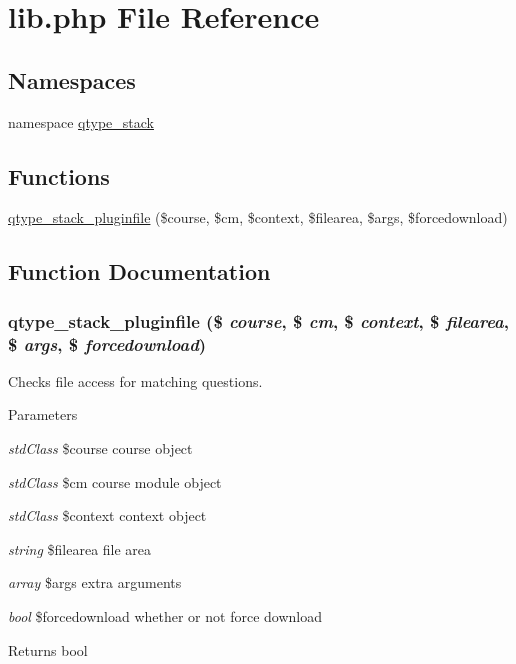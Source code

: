 \hypertarget{lib_8php}{
\section{lib.php File Reference}
\label{lib_8php}
}
\subsection*{Namespaces}
\begin{DoxyCompactItemize}
\item 
namespace \hyperlink{namespaceqtype__stack}{qtype\_\-stack}
\end{DoxyCompactItemize}
\subsection*{Functions}
\begin{DoxyCompactItemize}
\item 
\hyperlink{lib_8php_a0ba3041a96358224fa27aa86fa9ca065}{qtype\_\-stack\_\-pluginfile} (\$course, \$cm, \$context, \$filearea, \$args, \$forcedownload)
\end{DoxyCompactItemize}


\subsection{Function Documentation}
\hypertarget{lib_8php_a0ba3041a96358224fa27aa86fa9ca065}{
\subsubsection[{qtype\_\-stack\_\-pluginfile}]{\setlength{\rightskip}{0pt plus 5cm}qtype\_\-stack\_\-pluginfile (\$ {\em course}, \/  \$ {\em cm}, \/  \$ {\em context}, \/  \$ {\em filearea}, \/  \$ {\em args}, \/  \$ {\em forcedownload})}}
\label{lib_8php_a0ba3041a96358224fa27aa86fa9ca065}
Checks file access for matching questions. 
\begin{DoxyParams}{Parameters}
\item[{\em stdClass}]\$course course object \item[{\em stdClass}]\$cm course module object \item[{\em stdClass}]\$context context object \item[{\em string}]\$filearea file area \item[{\em array}]\$args extra arguments \item[{\em bool}]\$forcedownload whether or not force download \end{DoxyParams}
\begin{DoxyReturn}{Returns}
bool 
\end{DoxyReturn}
